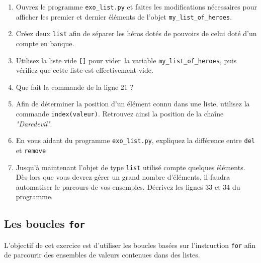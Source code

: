 \begin{enumerate}
\item  Ouvrez   le  programme  \texttt{exo\_list.py}  et   faites  les
  modifications  nécessaires pour  afficher  les premier  et  dernier
  éléments de l'objet \texttt{my\_list\_of\_heroes}.  %
\item  Créez deux  \texttt{list} afin  de séparer  les héros  dotés de
  pouvoirs de celui doté d'un compte en banque.  %
\item  Utilisez  la liste  vide  \texttt{[]}  pour \og{}vider\fg\  la  variable
  \texttt{my\_list\_of\_heroes},
  puis  vérifiez que  cette liste
  est effectivement vide.  %
\item Que fait la commande de la ligne 21 ?  %
\item  Afin de  déterminer la  position  d'un élément  connu dans  une
  liste, utilisez la commande \texttt{index(valeur)}.  Retrouvez ainsi
  la position de la chaîne \textit{"Daredevil"}.

\item En vous aidant  du programme \texttt{exo\_list.py}, expliquez la
  différence entre \texttt{del} et \texttt{remove}

\item Jusqu'à maintenant l'objet de type \texttt{list} utilisé compte quelques
  éléments. Dès lors que vous  devrez gérer un grand nombre d'éléments,
  il faudra  automatiser le parcours  de vos ensembles.   Décrivez les
  lignes 33 et 34 du programme.
\end{enumerate}



\subsection{Les boucles  \texttt{for}}

L'objectif  de cet  exercice est  d'utiliser les  boucles basées sur
l'instruction \texttt{for} afin  de  parcourir  des  ensembles  de
valeurs  contenues  dans  des listes.



